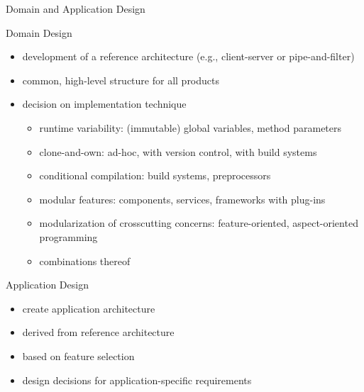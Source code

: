 \begin{frame}{Domain and Application Design}
	\begin{fancycolumns}[T,columns=3,widths={10,50}]
		\renewcommand{\projectcartoonwidth}{1}
	\nextcolumn
		\begin{definition}{Domain Design} %
			\begin{itemize}
				\item development of a reference architecture (e.g., client-server or pipe-and-filter)
				\item common, high-level structure for all products
				\item decision on implementation technique
					\begin{itemize}
						\item runtime variability: (immutable) global variables, method parameters
						\item clone-and-own: ad-hoc, with version control, with build systems
						\item conditional compilation: build systems, preprocessors
						\item modular features: components, services, frameworks with plug-ins
						\item modularization of crosscutting concerns: feature-oriented, aspect-oriented programming
						\item combinations thereof
					\end{itemize}
			\end{itemize}
		\end{definition}
	\nextcolumn
		\begin{definition}{Application Design\\}
			\begin{itemize}
				\item create application architecture
				\item derived from reference architecture
				\item based on feature selection
				\item design decisions for application-specific requirements
			\end{itemize}
		\end{definition}
	\end{fancycolumns}
\end{frame}

